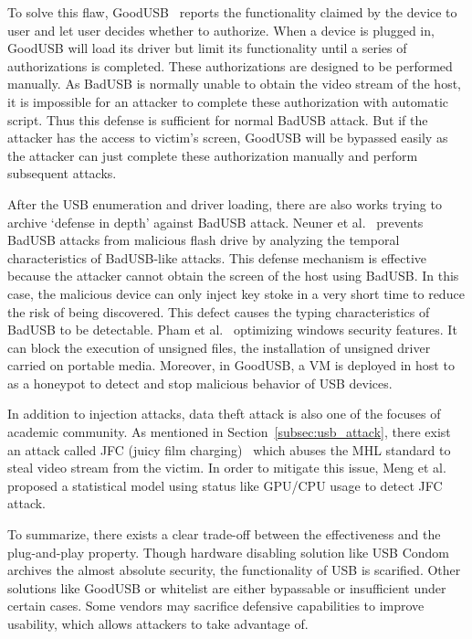 To solve this flaw, GoodUSB~\cite{tian2015defending} reports the functionality claimed
by the device to user and let user decides whether to authorize. When a device
is plugged in, GoodUSB will load its driver but limit its functionality until a
series of authorizations is completed. These authorizations are designed to be
performed manually. As BadUSB is normally unable to obtain the video stream of
the host, it is impossible for an attacker to complete these authorization with
automatic script. Thus this defense is sufficient for normal BadUSB attack. But
if the attacker has the access to victim's screen, GoodUSB will be bypassed
easily as the attacker can just complete these authorization manually and
perform subsequent attacks.

After the USB enumeration and driver loading, there are also works trying to archive `defense in depth'
against BadUSB attack.  Neuner et
al.~\cite{neuner2018usblock} prevents BadUSB attacks from malicious flash drive by analyzing
the temporal characteristics of BadUSB-like attacks. This defense mechanism is
effective because the attacker cannot obtain the screen of the host using
BadUSB. In this case, the malicious device can only inject key stoke in a very
short time to reduce the risk of being discovered. This defect causes the
typing characteristics of BadUSB to be detectable. Pham et
al.~\cite{pham2010optimizing} optimizing windows security features. It can
block the execution of unsigned files, the installation of unsigned driver
carried on portable media. Moreover, in GoodUSB, a VM is deployed in host to as
a honeypot to detect and stop malicious behavior of USB devices.

In addition to injection attacks, data theft attack is also one of the focuses
of academic community. As mentioned in Section~\ref{subsec:usb_attack}, there
exist an attack called JFC (juicy film charging)~\cite{JFC} which abuses the MHL
standard to steal video stream from the victim. In order to mitigate this
issue, Meng et al.~\cite{meng2018252} proposed a statistical model using status
like GPU/CPU usage to detect JFC attack.

To summarize, there exists a clear trade-off between the effectiveness and the
plug-and-play property. Though hardware disabling solution like USB Condom
archives the almost absolute security, the functionality of USB is scarified.
Other solutions like GoodUSB or whitelist are either bypassable or insufficient
under certain cases.  Some vendors may sacrifice defensive capabilities to
improve usability, which allows attackers to take advantage of.

